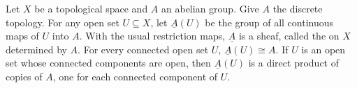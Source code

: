 Let $X$ be a topological space and $A$ an abelian group. Give $A$ the discrete topology. For any open set $U \subseteq X$, let $\underline{A}(U)$ be the group of all continuous maps of $U$ into $A$. With the usual restriction maps, $\underline{A}$ is a sheaf, called the  on $X$ determined by $A$. For every connected open set $U$, $\underline{A}(U) \cong A$. If $U$ is an open set whose connected components are open, then $\underline{A}(U)$ is a direct product of copies of $A$, one for each connected component of $U$.

